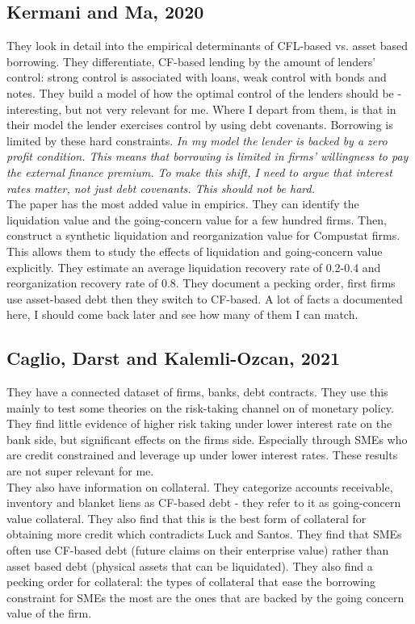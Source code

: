 \documentclass[12pt]{article}
\begin{document}
\subsection*{Kermani and Ma, 2020}
They look in detail into the empirical determinants of CFL-based vs. asset based borrowing. They differentiate, CF-based lending by the amount of lenders' control: strong control is associated with loans, weak control with bonds and notes. They build a model of how the optimal control of the lenders should be - interesting, but not very relevant for me. Where I depart from them, is that in their model the lender exercises control by using debt covenants. Borrowing is limited by these hard constraints. \textit{In my model the lender is backed by a zero profit condition. This means that borrowing is limited in firms' willingness to pay the external finance premium. To make this shift, I need to argue that interest rates matter, not just debt covenants. This should not be hard.}  \vspace{3mm} \\
The paper has the most added value in empirics. They can identify the liquidation value and the going-concern value for a few hundred firms. Then, construct a synthetic liquidation and reorganization value for Compustat firms. This allows them to study the effects of liquidation and going-concern value explicitly. They estimate an average liquidation recovery rate of 0.2-0.4 and reorganization recovery rate of 0.8. They document a pecking order, first firms use asset-based debt then they switch to CF-based. A lot of facts a documented here, I should come back later and see how many of them I can match. 

\subsection*{Caglio, Darst and Kalemli-Ozcan, 2021}
They have a connected dataset of firms, banks, debt contracts. They use this mainly to test some theories on the risk-taking channel on of monetary policy. They find little evidence of higher risk taking under lower interest rate on the bank side, but significant effects on the firms side. Especially through SMEs who are credit constrained and leverage up under lower interest rates. These results are not super relevant for me. \vspace{3mm} \\
They also have information on collateral. They categorize accounts receivable, inventory and blanket liens as CF-based debt - they refer to it as going-concern value collateral. They also find that this is the best form of collateral for obtaining more credit which contradicts Luck and Santos. They find that SMEs often use CF-based debt (future claims on their enterprise value) rather than asset based debt (physical assets that can be liquidated). They also find a pecking order for collateral: the types of collateral that ease the borrowing constraint for SMEs the most are the ones that are backed by the going concern value of the firm. 
\end{document}
